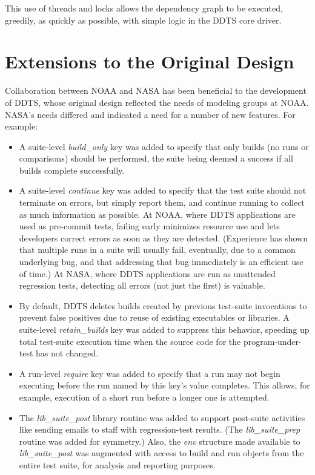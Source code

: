 \documentclass[conference]{IEEEtran}
\begin{document}
This use of threads and locks allows the dependency graph to be executed, greedily, as quickly as possible, with simple logic in the DDTS core driver.

\section{Extensions to the Original Design}

Collaboration between NOAA and NASA has been beneficial to the development of DDTS, whose original design reflected the needs of modeling groups at NOAA. NASA's needs differed and indicated a need for a number of new features. For example:

\begin{itemize}
\item A suite-level \emph{build\_only} key was added to specify that only builds (no runs or comparisons) should be performed, the suite being deemed a success if all builds complete successfully.
\item A suite-level \emph{continue} key was added to specify that the test suite should not terminate on errors, but simply report them, and continue running to collect as much information as possible. At NOAA, where DDTS applications are used as pre-commit tests, failing early minimizes resource use and lets developers correct errors as soon as they are detected. (Experience has shown that multiple runs in a suite will usually fail, eventually, due to a common underlying bug, and that addressing that bug immediately is an efficient use of time.) At NASA, where DDTS applications are run as unattended regression tests, detecting all errors (not just the first) is valuable.
\item By default, DDTS deletes builds created by previous test-suite invocations to prevent false positives due to reuse of existing executables or libraries. A suite-level \emph{retain\_builds} key was added to suppress this behavior, speeding up total test-suite execution time when the source code for the program-under-test has not changed.
\item A run-level \emph{require} key was added to specify that a run may not begin executing before the run named by this key's value completes. This allows, for example, execution of a short run before a longer one is attempted.
\item The \emph{lib\_suite\_post} library routine was added to support post-suite activities like sending emails to staff with regression-test results. (The \emph{lib\_suite\_prep} routine was added for symmetry.) Also, the \emph{env} structure made available to \emph{lib\_suite\_post} was augmented with access to build and run objects from the entire test suite, for analysis and reporting purposes.

\end{itemize}
\end{document}
